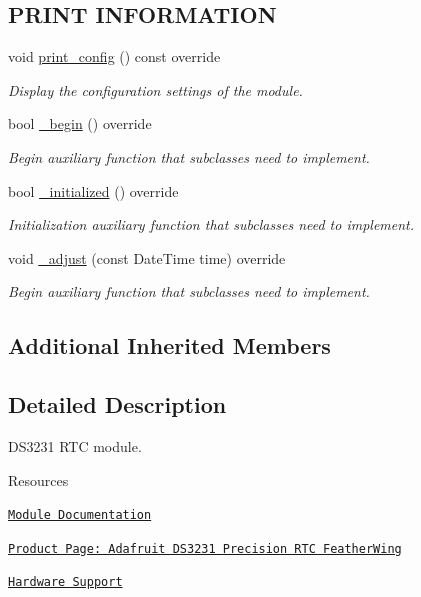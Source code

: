 \subsection*{P\+R\+I\+NT I\+N\+F\+O\+R\+M\+A\+T\+I\+ON}
\begin{DoxyCompactItemize}
\item 
void \hyperlink{class_loom___d_s3231_a82be3e8bae268cb80bca455e5fef1289}{print\+\_\+config} () const override
\begin{DoxyCompactList}\small\item\em Display the configuration settings of the module. \end{DoxyCompactList}\item 
bool \hyperlink{class_loom___d_s3231_a204356e5f64a038f14a53c5106d17e9d}{\+\_\+begin} () override
\begin{DoxyCompactList}\small\item\em Begin auxiliary function that subclasses need to implement. \end{DoxyCompactList}\item 
bool \hyperlink{class_loom___d_s3231_a8dd6327294c41f8aaea424660770184e}{\+\_\+initialized} () override
\begin{DoxyCompactList}\small\item\em Initialization auxiliary function that subclasses need to implement. \end{DoxyCompactList}\item 
void \hyperlink{class_loom___d_s3231_a1f1825fe54a8308bdcea79814d5d7d5c}{\+\_\+adjust} (const Date\+Time time) override
\begin{DoxyCompactList}\small\item\em Begin auxiliary function that subclasses need to implement. \end{DoxyCompactList}\end{DoxyCompactItemize}
\subsection*{Additional Inherited Members}


\subsection{Detailed Description}
D\+S3231 R\+TC module. 

\begin{DoxyParagraph}{Resources}

\begin{DoxyItemize}
\item \href{https://openslab-osu.github.io/Loom/html/class_loom___d_s3231.html}{\tt Module Documentation}
\item \href{https://www.adafruit.com/product/3028}{\tt Product Page\+: Adafruit D\+S3231 Precision R\+TC Feather\+Wing}
\item \href{https://github.com/OPEnSLab-OSU/Loom/wiki/Hardware-Support#ds3231-rtc}{\tt Hardware Support} 
\end{DoxyItemize}
\end{DoxyParagraph}


